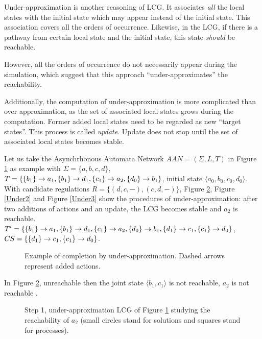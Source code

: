 Under-approximation is another reasoning of LCG. 
It associates \textit{all} the local states with the initial state which may appear instead of the initial state.
This association covers all the orders of occurrence.
Likewise, in the LCG, if there is a pathway from certain local state and the initial state, this state \textit{should} be reachable.

However, all the orders of occurrence do not necessarily appear during the simulation, which suggest that this approach ``under-approximates'' the reachability.

Additionally, the computation of under-approximation is more complicated than over approximation, as the set of associated local states grows during the computation.
Former added local states need to be regarded as new ``target states''.
This process is called \textit{update}. 
Update does not stop until the set of associated local states becomes stable.

\begin{definition}
    
\end{definition}

Let us take the Asynchrhonous Automata Network $AAN=(\Sigma, L, T)$ in Figure \ref{ExUnder} as example with $\Sigma= \{a,b,c,d\}$, $T=\{\acm{b_1}{a_0}{a_1}, \acm{b_1}{d_0}{d_1},\acm{c_1}{a_1}{a_2}, \acm{d_0}{b_0}{b_1}\}$, initial state $\langle a_0,b_0,c_0,d_0\rangle$.
With candidate regulations $R=\{(d,c,-),(c,d,-)\}$, Figure \ref{Under1}, Figure \ref{Under2} and Figure \ref{Under3} show the procedures of under-approximation: after two additions of actions and an update, the LCG becomes stable and $a_2$ is reachable.
$T'=\{\acm{b_1}{a_0}{a_1}, \acm{b_1}{d_0}{d_1},\acm{c_1}{a_1}{a_2}, \acm{d_0}{b_0}{b_1},\acm{d_1}{c_0}{c_1}, \acm{c_1}{d_1}{d_0}\}$, $CS=\{\acm{d_1}{c_0}{c_1}, \acm{c_1}{d_1}{d_0}\}$.

\begin{figure}[ht]
\centering

\caption[Completion by under-approximation]{Example of completion by under-approximation. Dashed arrows represent added actions.}\label{ExUnder}
\end{figure}

In Figure \ref{Under1},  unreachable then the joint state $\langle b_1, c_1\rangle$ is not reachable, $a_2$ is not reachable .

\begin{figure}[ht]
\centering

\caption[Operations on LCG(1)]{Step 1, under-approximation LCG of Figure \ref{ExUnder} studying the reachability of $a_2$ (small circles stand for solutions and squares stand for processes). }\label{Under1}
\end{figure}

